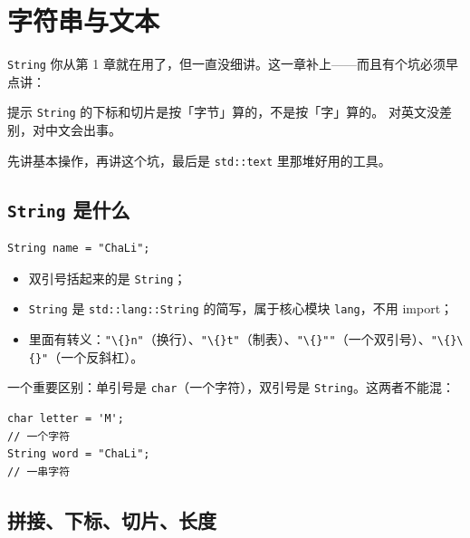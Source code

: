 \chapter{字符串与文本}
\label{ch:12}

\texttt{String} 你从第 1 章就在用了，但一直没细讲。这一章补上——而且有个坑必须早点讲：

\begin{tip}{提示}
\texttt{String} 的下标和切片是按「字节」算的，不是按「字」算的。 对英文没差别，对中文会出事。
\end{tip}

先讲基本操作，再讲这个坑，最后是 \texttt{std:\allowbreak{}:\allowbreak{}text} 里那堆好用的工具。

\section{\texttt{String} 是什么}

\par
\medskip
\begin{lstlisting}[style=chali]
String name = "ChaLi";
\end{lstlisting}
\par
\medskip

\begin{itemize}

\item 双引号括起来的是 \texttt{String}；

\item \texttt{String} 是 \texttt{std:\allowbreak{}:\allowbreak{}lang:\allowbreak{}:\allowbreak{}String} 的简写，属于核心模块 \texttt{lang}，不用 import；

\item 里面有转义：\texttt{"\textbackslash\{\}n"}（换行）、\texttt{"\textbackslash\{\}t"}（制表）、\texttt{"\textbackslash\{\}""}（一个双引号）、\texttt{"\textbackslash\{\}\textbackslash\{\}"}（一个反斜杠）。

\end{itemize}

一个重要区别：单引号是 \texttt{char}（一个字符），双引号是 \texttt{String}。这两者不能混：

\par
\medskip
\begin{lstlisting}[style=chali]
char letter = 'M';
// 一个字符
String word = "ChaLi";
// 一串字符
\end{lstlisting}
\par
\medskip

\section{拼接、下标、切片、长度}

